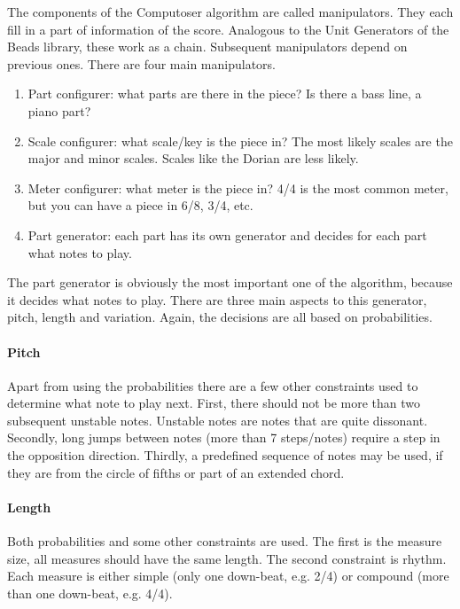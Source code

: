 \documentclass[12pt]{article}
\begin{document}
The components of the Computoser algorithm are called manipulators. They each fill in a part of information of the score. Analogous to the Unit Generators of the Beads library, these work as a chain. Subsequent manipulators depend on previous ones. There are four main manipulators.
\newline

\begin{enumerate}
\item Part configurer: what parts are there in the piece? Is there a bass line, a piano part?
\item Scale configurer: what scale/key is the piece in? The most likely scales are the major and minor scales. Scales like the Dorian are less likely.
\item Meter configurer: what meter is the piece in? 4/4 is the most common meter, but you can have a piece in 6/8, 3/4, etc.
\item Part generator: each part has its own generator and decides for each part what notes to play.
\end{enumerate}
 
The part generator is obviously the most important one of the algorithm, because it decides what notes to play. There are three main aspects to this generator, pitch, length and variation. Again, the decisions are all based on probabilities.

\paragraph{Pitch} Apart from using the probabilities there are a few other constraints used to determine what note to play next. First, there should not be more than two subsequent unstable notes. Unstable notes are notes that are quite dissonant. Secondly, long jumps between notes (more than 7 steps/notes) require a step in the opposition direction. Thirdly, a predefined sequence of notes may be used, if they are from the circle of fifths or part of an extended chord.

\paragraph{Length} Both probabilities and some other constraints are used. The first is the measure size, all measures should have the same length. The second constraint is rhythm. Each measure is either simple (only one down-beat, e.g. 2/4) or compound (more than one down-beat, e.g. 4/4).
\end{document}
